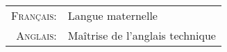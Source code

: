 %
%
%
\begin{tabular}{>{\small}r>{\small}l}
 \parbox{\datebox}{\raggedleft\textsc{Français:}}&Langue maternelle\\
\textsc{Anglais:}&Maîtrise de l'anglais technique\\
\end{tabular}